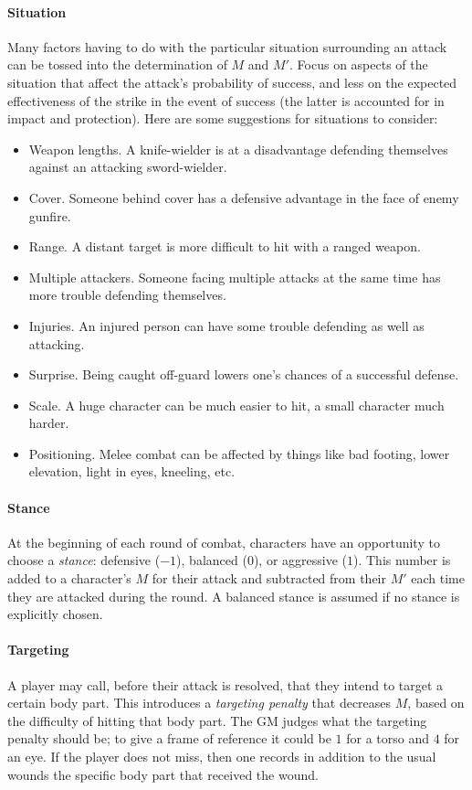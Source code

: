 \documentclass[12pt]{article}
\newcommand{\emdex}[1]{\emph{#1}\index{#1}}
\begin{document}
\paragraph{Situation}
Many factors having to do with the particular situation
surrounding an attack can be tossed into the determination of $M$ and $M'$.
Focus on
aspects of the situation that affect the attack's probability of success,
and less on the expected effectiveness of the strike in the
event of success (the latter is accounted for in impact and protection).
Here are some suggestions for situations to consider:
\vspace{-1em}\begin{itemize}
\item Weapon lengths. A knife-wielder is at a disadvantage defending themselves against an attacking sword-wielder.
\item Cover. Someone behind cover has a defensive advantage in the face of enemy gunfire.
\item Range. A distant target is more difficult to hit with a ranged weapon.
\item Multiple attackers. Someone facing multiple attacks at the same time has more trouble defending themselves.
\item Injuries. An injured person can have some trouble defending as well as attacking.
\item Surprise. Being caught off-guard lowers one's chances of a successful defense.
\item Scale. A huge character can be much easier to hit, a small character much harder.
\item Positioning. Melee combat can be affected by things like bad footing,
lower elevation, light in eyes, kneeling, etc. %
\end{itemize}




\paragraph{Stance}
At the beginning of each round of combat,
characters have an opportunity to choose a \emdex{stance}:
defensive ($-1$), balanced ($0$), or aggressive ($1$).
This number is added to a character's $M$ for their attack and subtracted from their
$M'$ each time they are attacked during the round.
A balanced stance is assumed if no stance is explicitly chosen.


\paragraph{Targeting}
A player may call, before their attack is resolved, that they intend to target a certain body part.
This introduces a \emdex{targeting penalty} that decreases $M$, based on the difficulty of hitting that body part.
The GM judges what the targeting penalty should be;
to give a frame of reference it could be $1$ for a torso and $4$ for an eye.
If the player does not miss, then one records in addition to the usual wounds the specific body part that received the wound.
\end{document}
